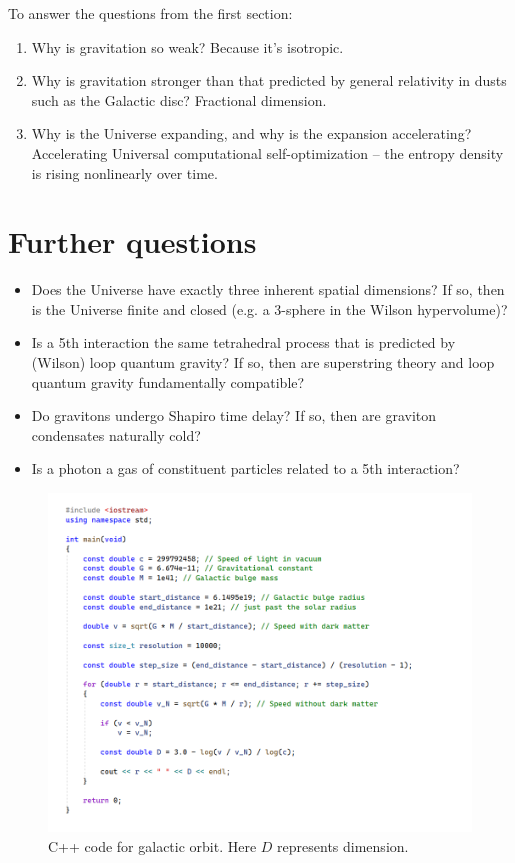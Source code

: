 \documentclass[12pt]{article}
\begin{document}
To answer the questions from the first section:
\begin{enumerate}
\item Why is gravitation so weak? Because it's isotropic.
\item Why is gravitation stronger than that predicted by general relativity in dusts such as the Galactic disc? Fractional dimension.
\item Why is the Universe expanding, and why is the expansion accelerating? Accelerating Universal computational self-optimization -- the entropy density is rising nonlinearly over time.
\end{enumerate}









\section{Further questions}
\begin{itemize}
\item Does the Universe have exactly three inherent spatial dimensions?
If so, then is the Universe finite and closed (e.g. a 3-sphere in the Wilson hypervolume)?
\item Is a 5th interaction the same tetrahedral process that is predicted by (Wilson) loop quantum gravity?
If so, then are superstring theory and loop quantum gravity fundamentally compatible?
\item Do gravitons undergo Shapiro time delay?
If so, then are graviton condensates naturally cold?
\item Is a photon a gas of constituent particles related to a 5th interaction?
\end{itemize}






\pagebreak




\begin{figure} 
\centering
  \includegraphics[width = 8 in]{code.png}
  \caption{ C++ code for galactic orbit. Here $D$ represents dimension.}
\end{figure}
\end{document}
